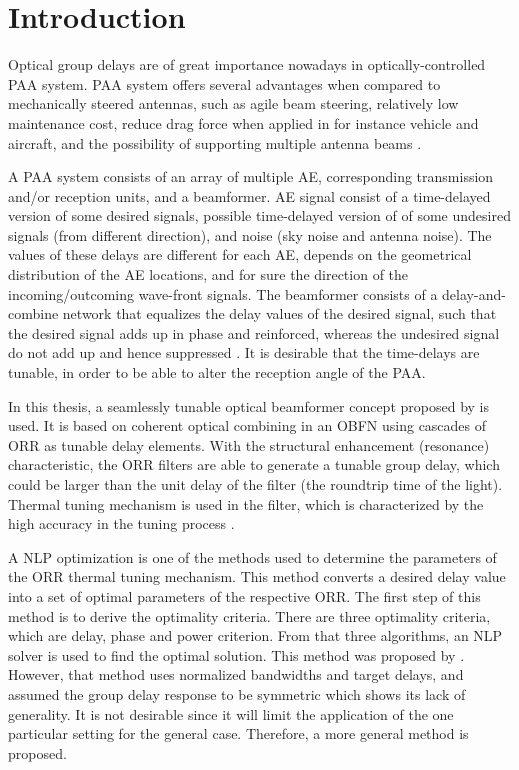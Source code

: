 %
\chapter{Introduction} \label{chap::intro}

Optical group delays are of great importance nowadays in optically-controlled \ac{PAA} system. \ac{PAA} system offers several advantages when compared to mechanically steered antennas, such as agile beam steering, relatively low maintenance cost, reduce drag force when applied in for instance vehicle and aircraft, and the possibility of supporting multiple antenna beams \citep{hansen2009phased}.

A \ac{PAA} system consists of an array of multiple \ac{AE}, corresponding transmission and/or reception units, and a beamformer. \ac{AE} signal consist of a time-delayed version of some desired signals, possible time-delayed version of of some undesired signals (from different direction), and noise (sky noise and antenna noise). The values of these delays are different for each \ac{AE}, depends on the geometrical distribution of the \ac{AE} locations, and for sure the direction of the incoming/outcoming wave-front signals. The beamformer consists of a delay-and-combine network that equalizes the delay values of the desired signal, such that the desired signal adds up in phase and reinforced, whereas the undesired signal do not add up and hence suppressed \citep{Meijerink1}. It is desirable that the time-delays are tunable, in order to be able to alter the reception angle of the \ac{PAA}. 

In this thesis, a seamlessly tunable optical beamformer concept proposed by \citet{meijerink2006phased} is used. It is based on coherent optical combining in an \ac{OBFN} using cascades of \ac{ORR} \citep{lenz2001optical,zhuang2005continuously} as tunable delay elements. With the structural enhancement (resonance) characteristic, the \ac{ORR} filters are able to generate a tunable group delay, which could be larger than the unit delay of the filter (the roundtrip time of the light). Thermal tuning mechanism is used in the filter, which is characterized by the high accuracy in the tuning process \citep{zhuang2005time}.

A \ac{NLP} optimization is one of the methods used to determine the parameters of the \ac{ORR} thermal tuning mechanism. This method converts a desired delay value into a set of optimal parameters of the respective \ac{ORR}. The first step of this method is to derive the optimality criteria. There are three optimality criteria, which are delay, phase and power criterion. From that three algorithms, an \ac{NLP} solver is used to find the optimal solution. This method was proposed by \citet{Blokpoel}. However, that method uses normalized bandwidths and target delays, and assumed the group delay response to be symmetric which shows its lack of generality. It is not desirable since it will limit the application of the one particular setting for the general case. Therefore, a more general method is proposed.

